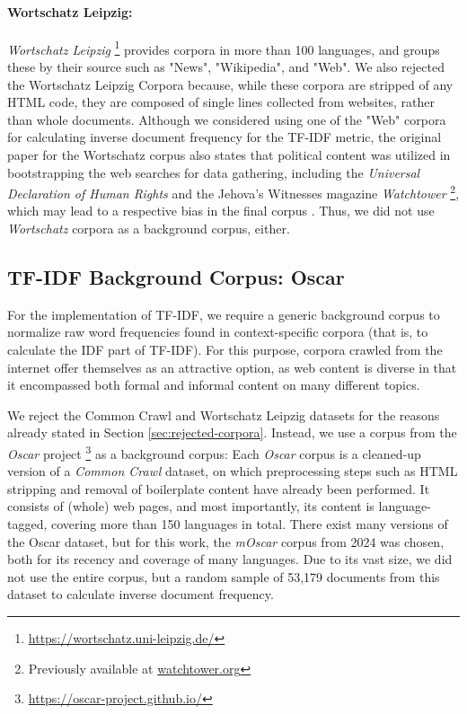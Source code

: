 \paragraph{Wortschatz Leipzig:}
\textit{Wortschatz Leipzig} \footnote{\url{https://wortschatz.uni-leipzig.de/}} provides corpora in more than 100 languages, and groups these by their source such as "News", "Wikipedia", and "Web".
We also rejected the Wortschatz Leipzig Corpora because, while these corpora are stripped of any HTML code, they are composed of single lines collected from websites, rather than whole documents.
Although we considered using one of the "Web" corpora for calculating inverse document frequency for the TF-IDF metric, the original paper for the Wortschatz corpus also states that political content was utilized in bootstrapping the web searches for data gathering, including the \textit{Universal Declaration of Human Rights} and the Jehova's Witnesses magazine \textit{Watchtower} \footnote{Previously available at \url{watchtower.org}}, which may lead to a respective bias in the final corpus \cite{goldhahnBuildingLargeMonolingual2012}.
Thus, we did not use \textit{Wortschatz} corpora as a background corpus, either.

\subsection{TF-IDF Background Corpus: Oscar} \label{sec:oscar}
For the implementation of TF-IDF, we require a generic background corpus to normalize raw word frequencies found in context-specific corpora (that is, to calculate the IDF part of TF-IDF).
For this purpose, corpora crawled from the internet offer themselves as an attractive option, as web content is diverse in that it encompassed both formal and informal content on many different topics.

We reject the Common Crawl and Wortschatz Leipzig datasets for the reasons already stated in Section \ref{sec:rejected-corpora}.
Instead, we use a corpus from the \textit{Oscar} project \footnote{\url{https://oscar-project.github.io/}} as a background corpus:
Each \textit{Oscar} corpus is a cleaned-up version of a \textit{Common Crawl} dataset, on which preprocessing steps such as HTML stripping and removal of boilerplate content have already been performed.
It consists of (whole) web pages, and most importantly, its content is language-tagged, covering more than 150 languages in total.
There exist many versions of the Oscar dataset, but for this work, the \textit{mOscar} \cite{futeralMOSCARLargescaleMultilingual2024} corpus from 2024 was chosen, both for its recency and coverage of many languages.
Due to its vast size, we did not use the entire corpus, but a random sample of 53,179 documents from this dataset to calculate inverse document frequency.

